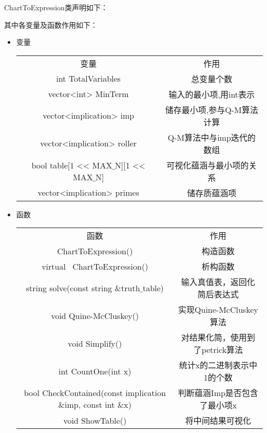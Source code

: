 ChartToExpression类声明如下：


其中各变量及函数作用如下：

\begin{itemize}
	\item{变量}
	\begin{center}
		\begin{tabular}{cc}
			变量 & 作用 \\
			int TotalVariables & 总变量个数 \\
			vector<int> MinTerm & 输入的最小项,用int表示\\
			vector<implication> imp & 储存最小项,参与Q-M算法计算\\
			vector<implication> roller & Q-M算法中与imp迭代的数组\\
			bool table[1 << MAX$\_$N][1 << MAX$\_$N] &
			可视化蕴涵与最小项的关系\\
			vector<implication> primes &
			储存质蕴涵项\\

		\end{tabular}
	\end{center}
	\item{函数}
	\begin{center}
		\begin{tabular}{cc}
			函数 & 作用 \\
			ChartToExpression() & 构造函数\\
			virtual ~ChartToExpression() & 析构函数\\
			string solve(const string $\&$truth$\_$table) &
			输入真值表，返回化简后表达式\\
			void Quine-McCluskey() & 实现Quine-McCluskey算法\\
			void Simplify() & 对结果化简，使用到了petrick算法\\
			int CountOne(int x) & 统计x的二进制表示中1的个数\\
			bool CheckContained(const implication $\&$imp, const int $\&$x) &
			判断蕴涵Imp是否包含了最小项x\\
			void ShowTable() & 将中间结果可视化\\
		\end{tabular}
	\end{center}
\end{itemize}


